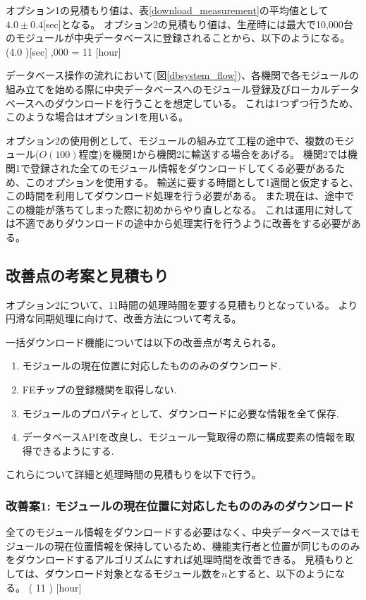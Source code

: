 オプション1の見積もり値は、表\ref{download_measurement}の平均値として$4.0\pm0.4$[sec]となる。
オプション2の見積もり値は、生産時には最大で10,000台のモジュールが中央データベースに登録されることから、以下のようになる。
\bbb
(4.0 )[\rm{sec}] ,000 = 11  [{\rm hour}]
\eee

データベース操作の流れにおいて(図\ref{dbsystem_flow})、各機関で各モジュールの組み立てを始める際に中央データベースへのモジュール登録及びローカルデータベースへのダウンロードを行うことを想定している。
これは1つずつ行うため、このような場合はオプション1を用いる。

オプション2の使用例として、モジュールの組み立て工程の途中で、複数のモジュール($O(100)$程度)を機関1から機関2に輸送する場合をあげる。
機関2では機関1で登録された全てのモジュール情報をダウンロードしてくる必要があるため、このオプションを使用する。
輸送に要する時間として1週間と仮定すると、この時間を利用してダウンロード処理を行う必要がある。
また現在は、途中でこの機能が落ちてしまった際に初めからやり直しとなる。
これは運用に対しては不適でありダウンロードの途中から処理実行を行うように改善をする必要がある。

\subsection{改善点の考案と見積もり}

オプション2について、11時間の処理時間を要する見積もりとなっている。
より円滑な同期処理に向けて、改善方法について考える。

一括ダウンロード機能については以下の改善点が考えられる。
\begin{enumerate}
  \item モジュールの現在位置に対応したもののみのダウンロード.
  \item FEチップの登録機関を取得しない.
  \item モジュールのプロパティとして、ダウンロードに必要な情報を全て保存.
  \item データベースAPIを改良し、モジュール一覧取得の際に構成要素の情報を取得できるようにする.
\end{enumerate}

これらについて詳細と処理時間の見積もりを以下で行う。

\subsubsection{改善案1: モジュールの現在位置に対応したもののみのダウンロード}
全てのモジュール情報をダウンロードする必要はなく、中央データベースではモジュールの現在位置情報を保持しているため、機能実行者と位置が同じもののみをダウンロードするアルゴリズムにすれば処理時間を改善できる。
見積もりとしては、ダウンロード対象となるモジュール数を$n$とすると、以下のようになる。
\bbb
( 11  ) \times {} [{\rm hour}]
\eee

